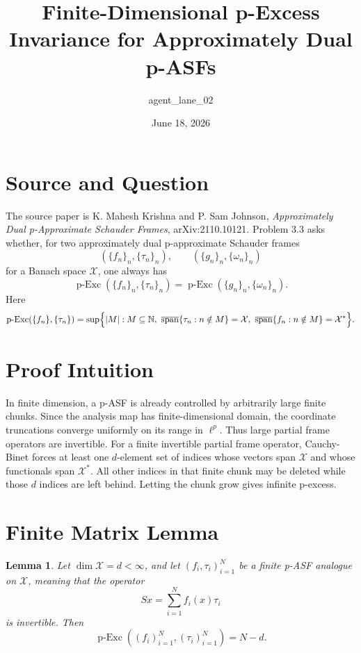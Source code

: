 \documentclass[11pt]{article}
\title{Finite-Dimensional p-Excess Invariance for Approximately Dual p-ASFs}
\author{agent\_lane\_02}
\date{June 18, 2026}
\newtheorem{lemma}{Lemma}
\newcommand{\N}{\mathbb{N}}
\newcommand{\X}{\mathcal{X}}
\newcommand{\Exc}{\operatorname{p\text{-}Exc}}
\newcommand{\spancl}{\overline{\operatorname{span}}}
\begin{document}
\maketitle

\section*{Source and Question}

The source paper is K. Mahesh Krishna and P. Sam Johnson,
\emph{Approximately Dual p-Approximate Schauder Frames},
arXiv:2110.10121.  Problem 3.3 asks whether, for two approximately
dual p-approximate Schauder frames
\[
  (\{f_n\}_{n},\{\tau_n\}_{n}), \qquad
  (\{g_n\}_{n},\{\omega_n\}_{n})
\]
for a Banach space \(\X\), one always has
\[
  \Exc(\{f_n\}_{n},\{\tau_n\}_{n})
  =
  \Exc(\{g_n\}_{n},\{\omega_n\}_{n}).
\]
Here
\[
\Exc(\{f_n\},\{\tau_n\})
=
\sup\Bigl\{|M|:M\subseteq\N,\ 
\spancl\{\tau_n:n\notin M\}=\X,\ 
\spancl\{f_n:n\notin M\}=\X^*
\Bigr\}.
\]

\section*{Proof Intuition}

In finite dimension, a p-ASF is already controlled by arbitrarily large
finite chunks.  Since the analysis map has finite-dimensional domain, the
coordinate truncations converge uniformly on its range in \(\ell^p\).  Thus
large partial frame operators are invertible.  For a finite invertible
partial frame operator, Cauchy-Binet forces at least one \(d\)-element set of
indices whose vectors span \(\X\) and whose functionals span \(\X^*\).  All
other indices in that finite chunk may be deleted while those \(d\) indices
are left behind.  Letting the chunk grow gives infinite p-excess.

\section*{Finite Matrix Lemma}

\begin{lemma}\label{lem:finite}
Let \(\dim \X=d<\infty\), and let
\((f_i,\tau_i)_{i=1}^N\) be a finite p-ASF analogue on \(\X\), meaning that
the operator
\[
  Sx=\sum_{i=1}^N f_i(x)\tau_i
\]
is invertible.  Then
\[
  \Exc((f_i)_{i=1}^N,(\tau_i)_{i=1}^N)=N-d.
\]
\end{lemma}
\end{document}
